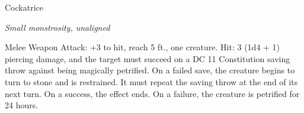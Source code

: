 \begin{monsterbox}{Cockatrice}
\begin{hangingpar}
\textit{Small monstrosity, unaligned}
\end{hangingpar}
\dndline%
\basics[%
armorclass = 11,
hitpoints = 6d6 + 6,
speed = {20 ft., fly 40 ft.}
]
\dndline%
\stats[%
STR = \stat{6},
DEX = \stat{12},
CON = \stat{12},
INT = \stat{2},
WIS = \stat{13},
CHA = \stat{5}
]
\dndline%
\details[%
skills={},
damageimmunities={},
savingthrows={},
conditionimmunities={},
damageresistances={},
damagevulnerabilities={},
senses={darkvision 60 ft., passive Perception 11},
challenge=1/2
]
\dndline%
\begin{monsteraction}[Bite]
Melee Weapon Attack: +3 to hit, reach 5 ft., one creature. Hit: 3 (1d4 + 1) piercing damage, and the target must succeed on a DC 11 Constitution saving throw against being magically petrified. On a failed save, the creature begins to turn to stone and is restrained. It must repeat the saving throw at the end of its next turn. On a success, the effect ends. On a failure, the creature is petrified for 24 hours.
\end{monsteraction}
\end{monsterbox}